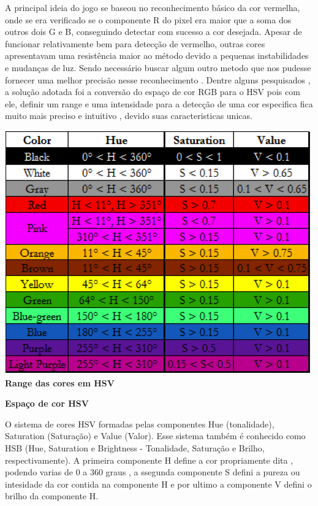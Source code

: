 \documentclass[a4paper]{article}
\begin{document}
A principal ideia do jogo se baseou no reconhecimento básico da cor vermelha, onde se era verificado se o componente R do pixel era maior que a soma dos outros dois G e B, conseguindo detectar com sucesso a cor desejada. Apesar de funcionar relativamente bem para detecção de vermelho, outras cores apresentavam uma resistência maior ao método devido a pequenas instabilidades e mudanças de luz. Sendo necessário buscar algum outro metodo que nos pudesse fornecer uma melhor precisão nesse reconhecimento . Dentre alguns pesquisados , a solução adotada foi a conversão do espaço de cor RGB para o HSV pois com ele, definir um range e uma intensidade para a detecção de uma cor especifica fica muito mais preciso e intuitivo , devido suas caracteristicas unicas.


\vspace{5.00mm}
\centering

\includegraphics[scale=0.8]{scale.png}
\centering
\\
\textbf{\normalsize Range das cores em HSV}

\begin{flushleft}
\textbf{\large Espaço de cor HSV}
\end{flushleft}
\raggedright
 O sistema de cores HSV formadas pelas componentes Hue (tonalidade), Saturation (Saturação) e Value (Valor). Esse sistema também é conhecido como HSB (Hue, Saturation e Brightness - Tonalidade, Saturação e Brilho, respectivamente). A primeira componente H define a cor propriamente dita , podendo varias de 0 a 360 graus , a ssegunda componente S defini a pureza ou intesidade da cor 
contida na componente H e por ultimo a componente V defini o brilho da componente H.
\end{document}
